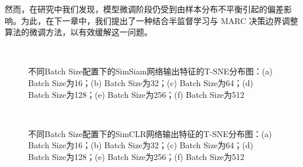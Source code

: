 \documentclass[master]{thesis-uestc}
\begin{document}
然而，在研究中我们发现，模型微调阶段仍受到由样本分布不平衡引起的偏差影响。为此，在下一章中，我们提出了一种结合半监督学习与 MARC 决策边界调整算法的微调方法，以有效缓解这一问题。

\begin{figure}
    \centering
    \\
    
    \caption{不同Batch Size配置下的SimSiam网络输出特征的T-SNE分布图：(a) Batch Size为16；(b) Batch Size为32；(c) Batch Size为64；(d) Batch Size为128；(e) Batch Size为256；(f) Batch Size为512}
    \label{tsne_simsiam_diff_batch_size}
\end{figure}

\begin{figure}
    \centering
    \\
    
    \caption{不同Batch Size配置下的SimCLR网络输出特征的T-SNE分布图：(a) Batch Size为16；(b) Batch Size为32；(c) Batch Size为64；(d) Batch Size为128；(e) Batch Size为256；(f) Batch Size为512}
    \label{tsne_simclr_diff_batch_size}
\end{figure}
\end{document}
